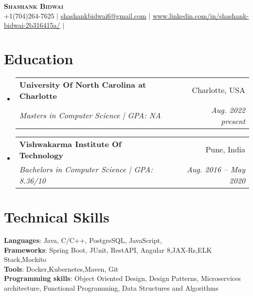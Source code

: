 \documentclass[letterpaper,11pt]{article}
\makeatletter
\newcommand{\resumeSubheading}[4]{
  \vspace{-2pt}\item
    \begin{tabular*}{0.97\textwidth}[t]{l@{\extracolsep{\fill}}r}
      \textbf{#1} & #2 \\
      \textit{\small#3} & \textit{\small #4} \\
    \end{tabular*}\vspace{-7pt}
}
\newcommand{\resumeSubHeadingListStart}{\begin{itemize}[leftmargin=0.15in, label={}]}
\newcommand{\resumeSubHeadingListEnd}{\end{itemize}}
\makeatother
\begin{document}

\begin{center}
    \textbf{\Huge \scshape Shashank Bidwai} \\ \vspace{1pt}
    \small +1(704)264-7625 $|$ \href{mailto:sbidwai@uncc.edu}{\underline{shashankbidwai6@gmail.com}} $|$ 
    \href{https://linkedin.com/in/...}{\underline{www.linkedin.com/in/shashank-bidwai-2b316415a/}} $|$
\end{center}


\section{Education}
  \resumeSubHeadingListStart
    \resumeSubheading
      {University Of North Carolina at Charlotte}{Charlotte, USA}
      {Masters in Computer Science | GPA: NA}{Aug. 2022 present}
    \resumeSubheading
      {Vishwakarma Institute Of Technology}{Pune, India}
      {Bachelors in Computer Science | GPA: 8.36/10}{Aug. 2016 -- May 2020}
  \resumeSubHeadingListEnd

\section{Technical Skills}
 \begin{itemize}[leftmargin=0.15in, label={}]
    \small{\item{
     \textbf{Languages}{: Java, C/C++, PostgreSQL, JavaScript,} \\
     \textbf{Frameworks}{: Spring Boot, JUnit, RestAPI, Angular 8,JAX-Rs,ELK Stack,Mockito} \\
     \textbf{Tools}{: Docker,Kubernetes,Maven, Git} \\
     \textbf{Programming skills}{: Object Oriented Design, Design Patterns, Microservices architecture, Functional Programming, Data Structures and Algorithms}
    }}
 \end{itemize}
\end{document}

